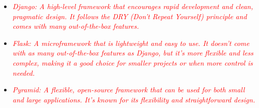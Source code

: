 \documentclass{article}
\begin{document}
\begin{enumerate}
         \begin{itemize}
            \item \textcolor{red}{\textit{Django: A high-level framework that encourages rapid development and clean, pragmatic design. 
            It follows the DRY (Don't Repeat Yourself) principle and comes with many out-of-the-box features.}}
            \item \textcolor{red}{\textit{Flask: A microframework that is lightweight and easy to use. It doesn't come with as many out-of-the-box features as Django, 
            but it's more flexible and less complex, making it a good choice for smaller projects or when more control is needed.}}
            \item \textcolor{red}{\textit{Pyramid: A flexible, open-source framework that can be used for both small and large applications.
             It's known for its flexibility and straightforward design.}}
         \end{itemize}


\end{enumerate}
\end{document}

